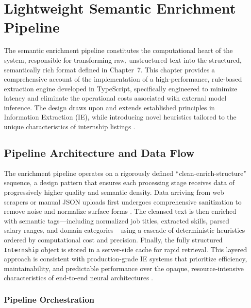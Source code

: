 \chapter{Lightweight Semantic Enrichment Pipeline}

The semantic enrichment pipeline constitutes the computational heart of the system, responsible for transforming raw, unstructured text into the structured, semantically rich format defined in Chapter~7. This chapter provides a comprehensive account of the implementation of a high-performance, rule-based extraction engine developed in TypeScript, specifically engineered to minimize latency and eliminate the operational costs associated with external model inference. The design draws upon and extends established principles in Information Extraction (IE), while introducing novel heuristics tailored to the unique characteristics of internship listings \cite{sarawagi2008information, grishman2015information}.

\section{Pipeline Architecture and Data Flow}

The enrichment pipeline operates on a rigorously defined ``clean-enrich-structure'' sequence, a design pattern that ensures each processing stage receives data of progressively higher quality and semantic density. Data arriving from web scrapers or manual JSON uploads first undergoes comprehensive sanitization to remove noise and normalize surface forms \cite{chu2016data}. The cleansed text is then enriched with semantic tags—including normalized job titles, extracted skills, parsed salary ranges, and domain categories—using a cascade of deterministic heuristics ordered by computational cost and precision. Finally, the fully structured \texttt{Internship} object is stored in a server-side cache for rapid retrieval. This layered approach is consistent with production-grade IE systems that prioritize efficiency, maintainability, and predictable performance over the opaque, resource-intensive characteristics of end-to-end neural architectures \cite{boselli2018classifying, menghani2023efficient}.

\subsection{Pipeline Orchestration}

